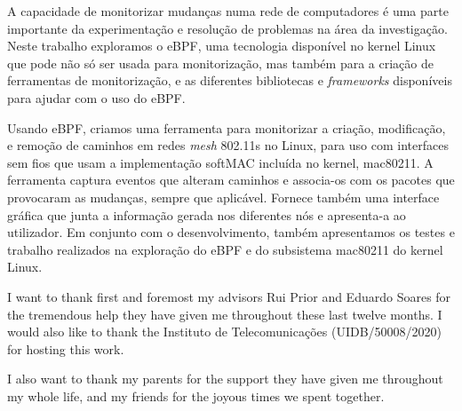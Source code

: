 
A capacidade de monitorizar mudanças numa rede de computadores é uma parte
importante da experimentação e resolução de problemas na área da investigação.
Neste trabalho exploramos o eBPF, uma tecnologia disponível no kernel Linux que
pode não só ser usada para monitorização, mas também para a criação de
ferramentas de monitorização, e as diferentes bibliotecas e \textit{frameworks}
disponíveis para ajudar com o uso do eBPF.

Usando eBPF, criamos uma ferramenta para monitorizar a criação, modificação, e
remoção de caminhos em redes \textit{mesh} 802.11s no Linux, para uso com
interfaces sem fios que usam a implementação softMAC incluída no kernel,
mac80211. A ferramenta captura eventos que alteram caminhos e associa-os com os
pacotes que provocaram as mudanças, sempre que aplicável. Fornece também uma
interface gráfica que junta a informação gerada nos diferentes nós e apresenta-a
ao utilizador. Em conjunto com o desenvolvimento, também apresentamos os testes
e trabalho realizados na exploração do eBPF e do subsistema mac80211 do kernel
Linux.



I want to thank first and foremost my advisors Rui Prior and Eduardo Soares for
the tremendous help they have given me throughout these last twelve months. I
would also like to thank the Instituto de Telecomunicações (UIDB/50008/2020) for
hosting this work.

I also want to thank my parents for the support they have given me throughout my
whole life, and my friends for the joyous times we spent together.
